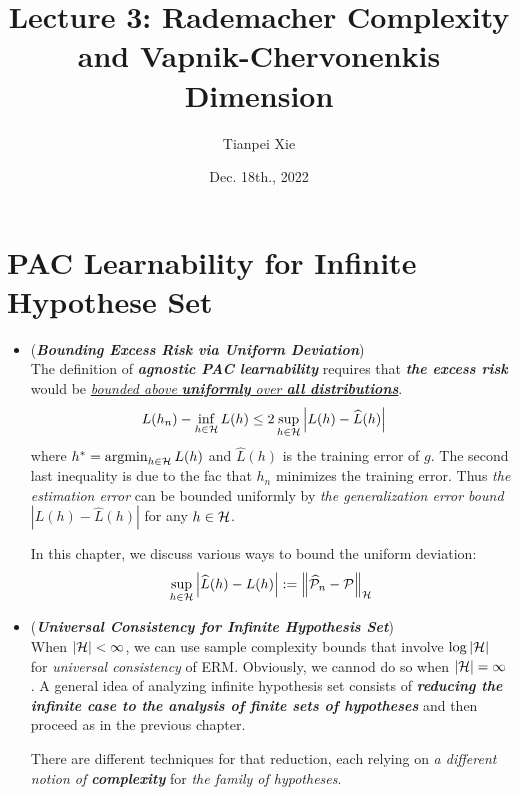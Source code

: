 \documentclass[11pt]{article}
\begin{document}
\title{Lecture 3: Rademacher Complexity and Vapnik-Chervonenkis Dimension}
\author{ Tianpei Xie}
\date{ Dec. 18th., 2022 }
\maketitle
\tableofcontents
\newpage
\section{PAC Learnability for Infinite Hypothese Set}
\begin{itemize}
\item \begin{remark} (\emph{\textbf{Bounding Excess Risk via Uniform Deviation}})\\
The definition of \emph{\textbf{agnostic PAC learnability}} requires that \emph{\textbf{the excess risk}} would be \underline{\emph{bounded above} \emph{\textbf{uniformly} over \textbf{all distributions}}}.
\begin{align}
L(h_n) - \inf_{h \in {\mathcal H}}L(h)  &\le  2 \sup_{h\in {\mathcal H}}\left\lvert L(h) - \widehat{L}(h) \right\rvert \label{ineqn: excess_risk_bound}
\end{align} where $h^{*} = \operatorname{argmin}_{h\in {\mathcal H}}L(h)$ and $\widehat{L}(h)$ is the training error of $g$. The second last inequality is due to the fac that $h_n$ minimizes the training error.  Thus \emph{the estimation error} can be bounded uniformly by \emph{the generalization error bound} $|L(h) - \widehat{L}(h)|$ for any $h \in {\mathcal H}$.

In this chapter, we discuss various ways to bound the uniform deviation:
\begin{align*}
\sup_{h\in {\mathcal H}}\left\lvert \widehat{L}(h) - L(h) \right\rvert := \left\|\widehat{{\mathcal P}}_n - {\mathcal P}\right\|_{{\mathcal H}}
\end{align*}
\end{remark} 

\item \begin{remark} (\emph{\textbf{Universal Consistency for Infinite Hypothesis Set}})\\
When $\left\lvert {\mathcal H} \right\rvert < \infty$, we can use sample complexity bounds that involve $\log \left\lvert {\mathcal H} \right\rvert$ for \emph{universal consistency} of ERM. Obviously, we cannod do so when $\left\lvert {\mathcal H} \right\rvert = \infty$. A general idea of analyzing infinite hypothesis set consists of \emph{\textbf{reducing the infinite case to the analysis of finite sets of hypotheses}} and then proceed as in the previous chapter. 

There are different techniques for that reduction, each relying on \emph{a different notion of \textbf{complexity}} for \emph{the family of hypotheses}. 
\end{remark}
\end{itemize}
\end{document}
